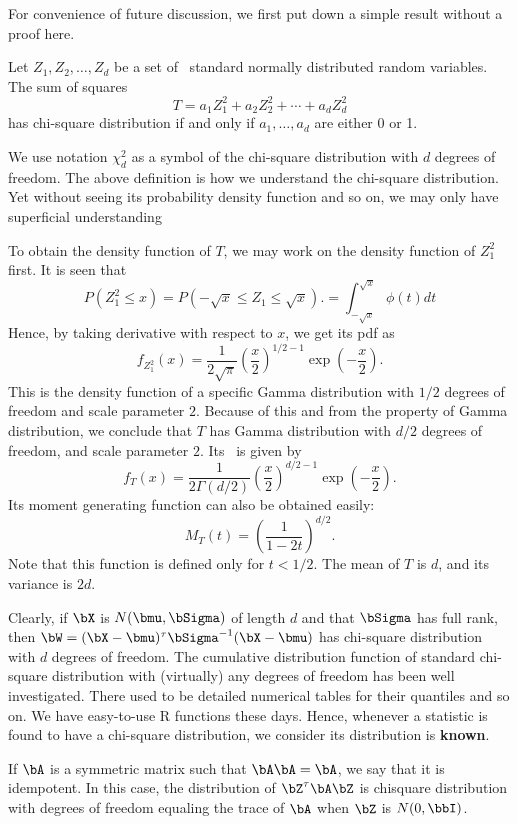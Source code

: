 For convenience of future discussion, we first put down
a simple result without a proof here.

\begin{theorem}
Let $Z_1, Z_2, \ldots, Z_d$ be a set of \iid\ standard normally
distributed random variables. The sum of squares
\[
T = a_1 Z_1^2 + a_2 Z_2^2 + \cdots + a_d Z_d^2
\]
has chi-square distribution if and only if $a_1, \ldots, a_d$
are either 0 or 1.
\end{theorem}

We use notation $\chi_d^2$ as a symbol of the chi-square
distribution with $d$ degrees of freedom.
The above definition is how we understand the chi-square distribution.
Yet without seeing its probability density function and so on,
we may only have superficial understanding

To obtain the density function of $T$, we may work on the
density function of $Z_1^2$ first. It is seen that
\[
P( Z_1^2 \leq x) = P( -\sqrt{x} \leq Z_1 \leq \sqrt{x} ).
= \int_{-\sqrt{x}}^{\sqrt{x}} \phi(t) dt
\]
Hence, by taking derivative with respect to $x$, we
get its pdf as
\[
f_{Z^2_1} (x) 
= 
\frac{1}{2\sqrt{\pi}} \left ( \frac{x}{2}\right )^{1/2 - 1} \exp( - \frac{x}{2} ).
\]
This is the density function of
a specific Gamma distribution with $1/2$ degrees of
freedom and scale parameter $2$.
Because of this and from the property of Gamma distribution,
we conclude that $T$ has Gamma distribution with $d/2$ degrees of
freedom, and scale parameter $2$.
Its \pdf\ is given by
\[
f_{T} (x) 
= 
\frac{1}{2\Gamma(d/2)} 
\left ( \frac{x}{2}\right )^{d/2 - 1} \exp( - \frac{x}{2} ).
\]
Its moment generating function can also be obtained
easily:
\[
M_T(t)
=
\left (\frac{ 1}{ 1 - 2t}\right )^{d/2}.
\]
Note that this function is defined only for $t < 1/2$.
The mean of $T$ is $d$, and its variance is $2d$.

Clearly, if $\bX$ is $N(\bmu, \bSigma)$ of length $d$ and that $\bSigma$
has full rank, then $\bW = (\bX - \bmu)^\tau \bSigma^{-1} (\bX - \bmu)$ 
has chi-square distribution with $d$ degrees of freedom.
The cumulative distribution function of standard chi-square distribution
with (virtually) any degrees of freedom has been well investigated.
There used to be detailed numerical tables for their quantiles and so on.
We have easy-to-use R functions these days. Hence, whenever
a statistic is found to have a chi-square distribution, we consider
its distribution is {\bf known}.


If $\bA$ is a symmetric matrix such that $\bA\bA = \bA$,
we say that it is idempotent. 
In this case, the distribution of $\bZ^\tau\bA\bZ$ is
chisquare distribution with
degrees of freedom equaling the trace of $\bA$
when $\bZ$ is $N(0, \bbI)$.

